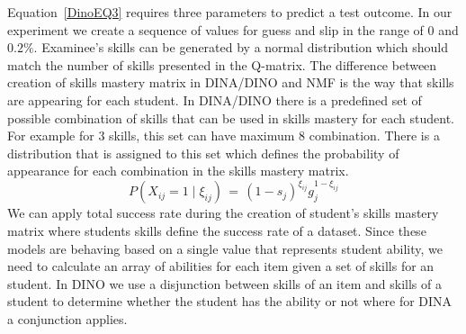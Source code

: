 Equation~\ref{DinoEQ3} requires three parameters to predict a test outcome. In our experiment we create a sequence of values for guess and slip in the range of $0$ and $0.2\%$. Examinee's skills can be generated by a normal distribution which should match the number of skills presented in the Q-matrix. The difference between creation of skills mastery matrix in DINA/DINO and NMF is the way that skills are appearing for each student. In DINA/DINO there is a predefined set of possible combination of skills that can be used in skills mastery for each student. For example for 3 skills, this set can have maximum 8 combination. There is a distribution that is assigned to this set which defines the probability of appearance for each combination in the skills mastery matrix. 
\begin{equation}
 P(X_{ij} \!=\! 1 \; | \; \xi_{ij}) \,=\, (1-s_j)^{\xi_{ij}} g_j^{1-\xi_{ij}}
\label{DinoEQ3}
\end{equation}
We can apply total success rate during the creation of student's skills mastery matrix where students skills define the success rate of a dataset. Since these models are behaving based on a single value that represents student ability, we need to calculate an array of abilities for each item given a set of skills for an student. In DINO we use a disjunction between skills of an item and skills of a student to determine whether the student has the ability or not where for DINA a conjunction applies.

